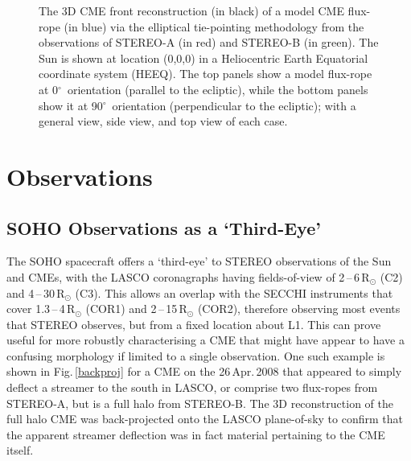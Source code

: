 \documentclass[preprint2]{aastex}
\begin{document}
\begin{figure}[!t]
\caption{The 3D CME front reconstruction (in black) of a model CME flux-rope (in blue) via the elliptical tie-pointing methodology from the observations of STEREO-A (in red) and STEREO-B (in green). The Sun is shown at location (0,0,0) in a Heliocentric Earth Equatorial coordinate system (HEEQ). The top panels show a model flux-rope at 0$^{\circ}$~orientation (parallel to the ecliptic), while the bottom panels show it at 90$^{\circ}$~orientation (perpendicular to the ecliptic); with a general view, side view, and top view of each case.}
\label{3d_panels}
\end{figure}


\section{Observations}

\subsection{SOHO Observations as a `Third-Eye'}


The SOHO spacecraft offers a `third-eye' to STEREO observations of the Sun and CMEs, with the LASCO coronagraphs having fields-of-view of 2\,--\,6\,R$_{\odot}$ (C2) and 4\,--\,30\,R$_{\odot}$ (C3). This allows an overlap with the SECCHI instruments that cover 1.3\,--\,4\,R$_{\odot}$ (COR1) and 2\,--\,15\,R$_{\odot}$ (COR2), therefore observing most events that STEREO observes, but from a fixed location about L1. This can prove useful for more robustly  characterising a CME that might have appear to have a confusing morphology if limited to a single observation. One such example is shown in Fig.\,\ref{backproj} for a CME on the 26\,Apr.\,2008 that appeared to simply deflect a streamer to the south in LASCO, or comprise two flux-ropes from STEREO-A, but is a full halo from STEREO-B. The 3D reconstruction of the full halo CME was back-projected onto the LASCO plane-of-sky to confirm that the apparent streamer deflection was in fact material pertaining to the CME itself.
\end{document}
